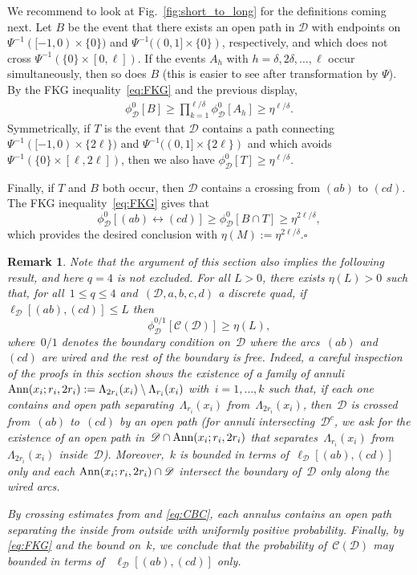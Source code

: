 \documentclass[a4paper,oneside,11pt]{article}
\newtheorem{remark}[theorem]{Remark}
\numberwithin{equation}{section}
\numberwithin{equation}{section}
\numberwithin{equation}{section}
\newcommand{\calC}{\mathcal{C}}
\newcommand{\calD}{\mathcal{D}}
\newcommand{\La}{\Lambda}
\newcommand{\Ann}{{\rm Ann}}
\begin{document}
	We recommend to look at Fig.~\ref{fig:short_to_long} for the definitions coming next. Let $B$ be the event that there exists an open path in $\calD$ 
	with endpoints on $\Psi^{-1}([-1,0) \times \{0\})$ and $\Psi^{-1}((0,1] \times \{0\})$, respectively,  
	and which does not cross $\Psi^{-1}(\{0\}\times [0,\ell])$.
	If the events $A_h$ with $h = \delta, 2\delta,\dots, \ell$ occur simultaneously, then so does $B$ (this is easier to see after transformation by $\Psi$).
	By the FKG inequality~\eqref{eq:FKG} and the previous display,
	\begin{align*}
		\phi_\calD^0 [B]  \geq \prod_{k=1}^{\ell /\delta} \phi_\calD^0 [A_h] \geq \eta^{\ell/\delta}.
	\end{align*}
	Symmetrically, if $T$ is the event that $\calD$ contains a path connecting 
	$\Psi^{-1}([-1,0) \times \{2\ell\})$ and $\Psi^{-1}((0,1] \times \{2\ell\})$ and which avoids $\Psi^{-1}(\{0\}\times [\ell, 2\ell])$, 
	then we also have $\phi_\calD^0 [T]\geq \eta^{\ell/\delta}$.
	
	Finally, if $T$ and $B$ both occur, then $\calD$ contains a crossing from $(ab)$ to $(cd)$. 
	The FKG inequality~\eqref{eq:FKG} gives that
	$$ \phi_{\calD}^0[(ab)\longleftrightarrow(cd)] \geq \phi_\calD^0 [B\cap T]\ge \eta^{2\ell/\delta},$$
	which provides the desired conclusion with $\eta(M):= \eta^{2\ell/\delta}$.\hfill $\square$

\begin{remark}
	Note that the argument of this section also implies the following result, and here $q=4$ is not excluded. 
	For all $L > 0$, there exists $\eta(L) >0$ such that, for all~$1\le q\le 4$
	and~$(\calD, a,b,c,d)$ a discrete quad, 
	if~$\ell_\calD[(ab),(cd)] \le L$ then~
	\[\phi_{\calD}^{0/1}[\calC(\calD)] \geq\eta(L),\]
	where~$0/1$ denotes the boundary condition on~$\calD$ where the arcs~$(ab)$ and~$(cd)$ are wired and the rest of the boundary is free. 
	Indeed, a careful inspection of the proofs in this section shows the existence of 
	a family of annuli~$\Ann(x_i; r_i,2r_i) := \La_{2r_i}(x_i) \setminus  \La_{r_i}(x_i)$ with~$i = 1,\dots, k$ such that, 
	if each one contains and open path separating~$\La_{r_i}(x_i)$ from~$\La_{2r_i}(x_i)$, 
	then~$\calD$ is crossed from~$(ab)$ to~$(cd)$ by an open path 
	(for annuli intersecting~$\calD^c$, we ask for the existence of an open path in~$\calD \cap \Ann(x_i; r_i,2r_i)$ 
	that separates~$\La_{r_i}(x_i)$ from~$\La_{2r_i}(x_i)$ \emph{inside}~$\calD$). 
	Moreover,~$k$ is bounded in terms of~$\ell_\calD[(ab),(cd)]$ only and each  
	$\Ann(x_i; r_i,2r_i) \cap \calD$ intersect the boundary of~$\calD$ only along the wired arcs. 
	
	By crossing estimates from \cite{DumSidTas16} and \eqref{eq:CBC}, each annulus contains an open path separating the inside from outside with uniformly positive probability. Finally, by \eqref{eq:FKG} and the bound on~$k$, we conclude that the probability of~$\calC(\calD)$ may bounded in terms of ~$\ell_\calD[(ab),(cd)]$ only. 
\end{remark}
\end{document}
